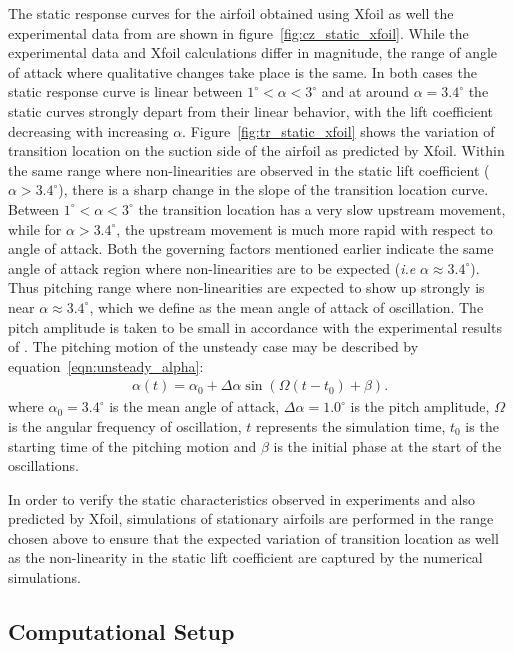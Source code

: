 The static response curves for the airfoil obtained using Xfoil as well the experimental data from \cite{lokattthesis} are shown in figure~\ref{fig:cz_static_xfoil}. While the experimental data and Xfoil calculations differ in magnitude, the range of angle of attack where qualitative changes take place is the same. In both cases the static response curve is linear between $1^{\circ}<\alpha<3^{\circ}$ and at around $\alpha=3.4^{\circ}$ the static curves strongly depart from their linear behavior, with the lift coefficient decreasing with increasing $\alpha$. Figure~\ref{fig:tr_static_xfoil} shows the variation of transition location on the suction side of the airfoil as predicted by Xfoil. Within the same range where non-linearities are observed in the static lift coefficient ($\alpha>3.4^{\circ}$), there is a sharp change in the slope of the transition location curve. Between $1^{\circ}<\alpha<3^{\circ}$ the transition location has a very slow upstream movement, while for $\alpha>3.4^{\circ}$, the upstream movement is much more rapid with respect to angle of attack. Both the governing factors mentioned earlier indicate the same angle of attack region where non-linearities are to be expected (\textit{i.e} $\alpha\approx3.4^{\circ}$). Thus pitching range where non-linearities are expected to show up strongly is near $\alpha\approx3.4^{\circ}$, which we define as the mean angle of attack of oscillation. The pitch amplitude is taken to be small in accordance with the experimental results of \cite{lokattthesis}. The pitching motion of the unsteady case may be described by equation~\ref{eqn:unsteady_alpha}:
\begin{align}
	\alpha(t) = \alpha_{0} + \Delta\alpha\sin(\Omega (t-t_{0}) + \beta).
	\label{eqn:unsteady_alpha}
\end{align}
where $\alpha_{0}=3.4^{\circ}$ is the mean angle of attack, $\Delta\alpha=1.0^{\circ}$ is the pitch amplitude, $\Omega$ is the angular frequency of oscillation, $t$ represents the simulation time, $t_{0}$ is the starting time of the pitching motion and $\beta$ is the initial phase at the start of the oscillations.   

In order to verify the static characteristics observed in experiments and also predicted by Xfoil, simulations of stationary airfoils are performed in the range chosen above to ensure that the expected variation of transition location as well as the non-linearity in the static lift coefficient are captured by the numerical simulations. 

\subsection{Computational Setup}

